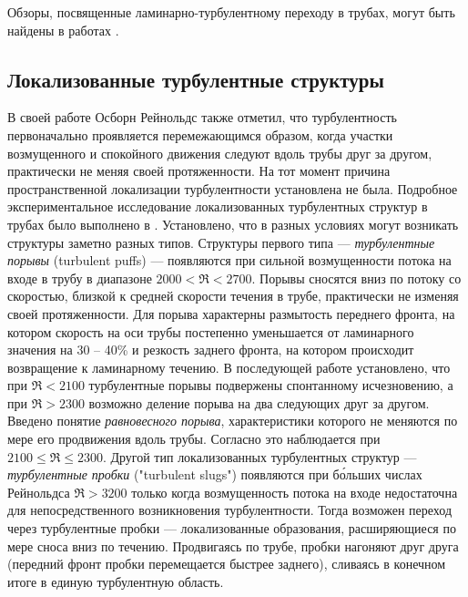 Обзоры, посвященные ламинарно-турбулентному переходу в трубах, могут быть найдены в работах \cite{Kerswell2005, Manneville2016, Kreilos2014}. 


	\subsection{Локализованные турбулентные структуры}

В своей работе \cite{Reynolds1883} Осборн Рейнольдс также отметил, что турбулентность первоначально проявляется перемежающимся образом, когда участки возмущенного и спокойного движения следуют вдоль трубы друг за другом, практически не меняя своей протяженности. На тот момент причина пространственной локализации турбулентности установлена не была. Подробное экспериментальное исследование локализованных турбулентных структур в трубах было выполнено в \cite{Wygnanski1973}. Установлено, что в разных условиях могут возникать структуры заметно разных типов. Структуры первого типа --- {\it турбулентные порывы} (turbulent puffs) --- появляются при сильной возмущенности потока на входе в трубу в диапазоне $2000<\Re<2700$. Порывы сносятся вниз по потоку со скоростью, близкой к средней скорости течения в трубе, практически не изменяя своей протяженности. Для порыва характерны размытость переднего фронта, на котором скорость на оси трубы постепенно уменьшается от ламинарного значения на 30 -- 40\% и резкость заднего фронта, на котором происходит возвращение к ламинарному течению. В последующей работе \cite{Wygnanski1975} установлено, что при $\Re<2100$ турбулентные порывы подвержены спонтанному исчезновению, а при $\Re>2300$ возможно деление порыва на два следующих друг за другом. Введено понятие {\it равновесного порыва}, характеристики которого не меняются по мере его продвижения вдоль трубы. Согласно \cite{Wygnanski1975} это наблюдается при $2100\leqslant \Re \leqslant 2300$. Другой тип локализованных турбулентных структур --- {\it турбулентные пробки} ("turbulent slugs") появляются при б\'{о}льших числах Рейнольдса $\Re>3200$ только когда возмущенность потока на входе недостаточна для непосредственного возникновения турбулентности. Тогда возможен переход через турбулентные пробки --- локализованные образования, расширяющиеся по мере сноса вниз по течению. Продвигаясь по трубе, пробки нагоняют друг друга (передний фронт пробки перемещается быстрее заднего), сливаясь в конечном итоге в единую турбулентную область.

